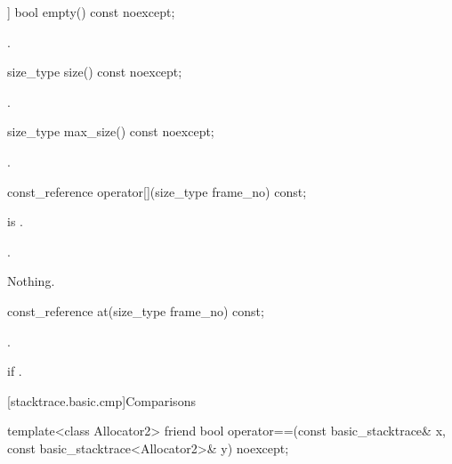 %
\begin{itemdecl}
[[nodiscard]] bool empty() const noexcept;
\end{itemdecl}

\begin{itemdescr}
\pnum
\returns
{}.
\end{itemdescr}

%
\begin{itemdecl}
size_type size() const noexcept;
\end{itemdecl}

\begin{itemdescr}
\pnum
\returns
{}.
\end{itemdescr}

%
\begin{itemdecl}
size_type max_size() const noexcept;
\end{itemdecl}

\begin{itemdescr}
\pnum
\returns
{}.
\end{itemdescr}

%
\begin{itemdecl}
const_reference operator[](size_type frame_no) const;
\end{itemdecl}

\begin{itemdescr}
\pnum
\expects
{} is .

\pnum
\returns
{}.

\pnum
\throws
Nothing.
\end{itemdescr}

%
\begin{itemdecl}
const_reference at(size_type frame_no) const;
\end{itemdecl}

\begin{itemdescr}
\pnum
\returns
{}.

\pnum
\throws
{} if .
\end{itemdescr}

[stacktrace.basic.cmp]{Comparisons}

%
\begin{itemdecl}
template<class Allocator2>
friend bool operator==(const basic_stacktrace& x, const basic_stacktrace<Allocator2>& y) noexcept;
\end{itemdecl}


